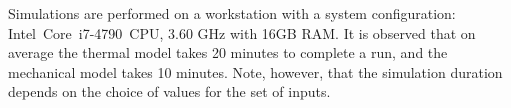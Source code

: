 Simulations are performed on a workstation with a system configuration: Intel~Core~i7-4790~CPU, 
3.60 GHz with 16GB RAM. It is observed that on average the thermal model takes 20 minutes to complete 
a run, and the
mechanical model takes 10 minutes. Note, however, that the simulation duration depends on the choice of
values for the set of inputs.  


























